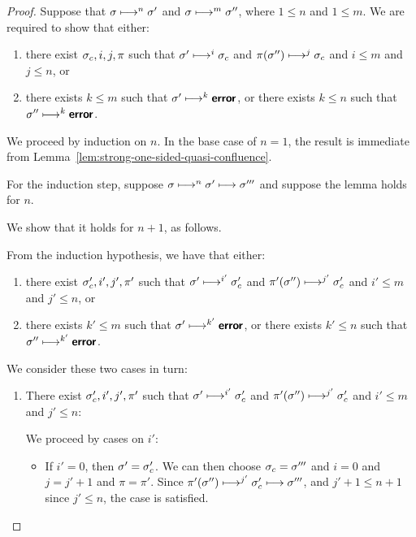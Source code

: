 \begin{proof}
  Suppose that $\sigma \longmapsto^n \sigma'$ and $\sigma \longmapsto^m
  \sigma''$, where $1 \leq n$ and $1 \leq m$.  We are required to show
  that either:
  \begin{enumerate}
    \item there exist $\sigma_c, i, j, \pi$ such that $\sigma'
      \longmapsto^i \sigma_c$ and $\pi(\sigma'') \longmapsto^j \sigma_c$
      and $i \leq m$ and $j \leq n$, or
  \item there exists $k \leq m$ such that $\sigma' \longmapsto^k
    \textup{\ensuremath{\textbf{\textsf{error}}}}$, or there exists $k \leq n$ such that $\sigma''
    \longmapsto^k \textup{\ensuremath{\textbf{\textsf{error}}}}$.
  \end{enumerate}

  We proceed by induction on $n$.  In the base case of $n = 1$, the
  result is immediate from
  Lemma~\ref{lem:strong-one-sided-quasi-confluence}.

  For the induction step, suppose $\sigma \longmapsto^n \sigma'
  \longmapsto \sigma'''$ and suppose the lemma holds for $n$.

  We show that it holds for $n + 1$, as follows.

  From the induction hypothesis, we have that either:
  \begin{enumerate}
  \item there exist $\sigma'_c, i', j', \pi'$ such that $\sigma'
    \longmapsto^{i'} \sigma'_c$ and $\pi'(\sigma'') \longmapsto^{j'}
    \sigma'_c$ and $i' \leq m$ and $j' \leq n$, or
  \item there exists $k' \leq m$ such that $\sigma' \longmapsto^{k'}
    \textbf{\textsf{error}}$, or there exists $k' \leq n$ such that $\sigma''
    \longmapsto^{k'} \textbf{\textsf{error}}$.
  \end{enumerate}

  We consider these two cases in turn:

  \begin{enumerate}
  \item There exist $\sigma'_c, i', j', \pi'$ such that $\sigma'
    \longmapsto^{i'} \sigma'_c$ and $\pi'(\sigma'') \longmapsto^{j'}
    \sigma'_c$ and $i' \leq m$ and $j' \leq n$:

    We proceed by cases on $i'$:
    \begin{itemize}

    \item If $i' = 0$, then $\sigma' = \sigma_c'$.  We can then choose
      $\sigma_c = \sigma'''$ and $i = 0$ and $j = j' + 1$ and $\pi =
      \pi'$.  Since $\pi'(\sigma'') \longmapsto^{j'} \sigma'_c
      \longmapsto \sigma'''$, and $j' + 1 \leq n + 1$ since $j' \leq
      n$, the case is satisfied.


\end{itemize}
\end{enumerate}
\end{proof}
